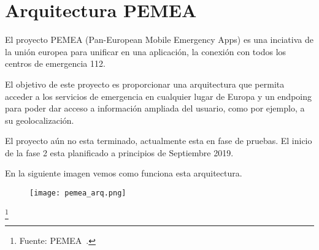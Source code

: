 
\section{Arquitectura PEMEA}

El proyecto PEMEA (Pan-European Mobile Emergency Apps) es una
 inciativa de la unión europea para unificar en una aplicación, la conexión 
con todos los centros de emergencia 112.

El objetivo de este proyecto es proporcionar una arquitectura que permita
 acceder a los servicios de emergencia en cualquier lugar de Europa y un 
endpoing para poder dar acceso a información ampliada del usuario, como
 por ejemplo, a su geolocalización.

El proyecto aún no esta terminado, actualmente esta en fase de pruebas.
 El inicio de la fase 2 esta planificado a principios de Septiembre 2019.

En la siguiente imagen vemos como funciona esta arquitectura.

\begin{figure}[h]
\texttt{[image: pemea\_arq.png]} 
\end{figure}

\footnote{Fuente: PEMEA~\cite{PEMEA}.}